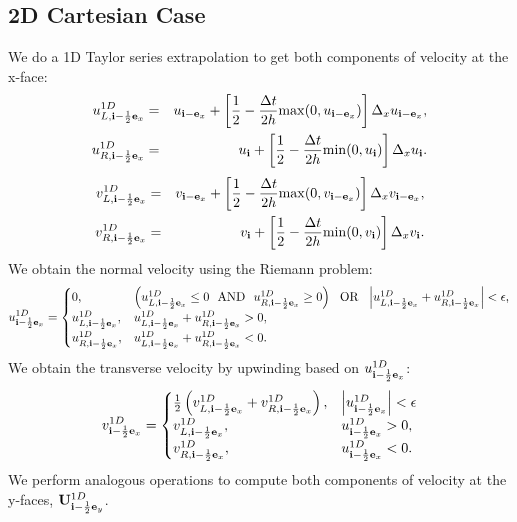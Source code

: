 \documentclass[11pt]{article}
\def\half  {\frac{1}{2}}
\def\dt    {\Delta t}
\def\eb    {{\bf e}}
\def\ib    {{\bf i}}
\def\Ub    {{\bf U}}
\begin{document}
\subsection{2D Cartesian Case}
We do a 1D Taylor series extrapolation to get both components of velocity at the x-face:
\begin{eqnarray}
u_{L,\ib-\half\eb_x}^{1D} &=& u_{\ib-\eb_x} + \left[\half - \frac{\dt}{2h}{\rm max}(0,u_{\ib-\eb_x})\right]\Delta_xu_{\ib-\eb_x}, \label{varden U_L^1D} \\
u_{R,\ib-\half\eb_x}^{1D} &=& u_{\ib} + \left[\half - \frac{\dt}{2h}{\rm min}(0,u_{\ib})\right]\Delta_xu_{\ib}.
\end{eqnarray}
\begin{eqnarray}
v_{L,\ib-\half\eb_x}^{1D} &=& v_{\ib-\eb_x} + \left[\half - \frac{\dt}{2h}{\rm max}(0,v_{\ib-\eb_x})\right]\Delta_xv_{\ib-\eb_x}, \label{varden U_L^1D} \\
v_{R,\ib-\half\eb_x}^{1D} &=& v_{\ib} + \left[\half - \frac{\dt}{2h}{\rm min}(0,v_{\ib})\right]\Delta_xv_{\ib}.
\end{eqnarray}
We obtain the normal velocity using the Riemann problem:
\begin{equation}
u_{\ib-\half\eb_x}^{1D} =
\begin{cases}
0, & \left(u_{L,\ib-\half\eb_x}^{1D} \le 0 ~~ {\rm AND} ~~ u_{R,\ib-\half\eb_x}^{1D} \ge 0\right) ~~ {\rm OR} ~~ \left|u_{L,\ib-\half\eb_x}^{1D} + u_{R,\ib-\half\eb_x}^{1D}\right| < \epsilon, \\
u_{L,\ib-\half\eb_x}^{1D}, & u_{L,\ib-\half\eb_x}^{1D} + u_{R,\ib-\half\eb_x}^{1D} > 0, \\
u_{R,\ib-\half\eb_x}^{1D}, & u_{L,\ib-\half\eb_x}^{1D} + u_{R,\ib-\half\eb_x}^{1D} < 0.
\end{cases}
\end{equation}
We obtain the transverse velocity by upwinding based on $u_{\ib-\half\eb_x}^{1D}$:
\begin{equation}
v_{\ib-\half\eb_x}^{1D} =
\begin{cases}
\half\left(v_{L,\ib-\half\eb_x}^{1D} + v_{R,\ib-\half\eb_x}^{1D}\right), & \left|u_{\ib-\half\eb_x}^{1D}\right| < \epsilon \\
v_{L,\ib-\half\eb_x}^{1D}, & u_{\ib-\half\eb_x}^{1D} > 0, \\
v_{R,\ib-\half\eb_x}^{1D}, & u_{\ib-\half\eb_x}^{1D} < 0.
\end{cases}\label{Transverse Velocity Riemann Problem}
\end{equation}
We perform analogous operations to compute both components of velocity at the y-faces, $\Ub_{\ib-\half\eb_y}^{1D}$. \\
\end{document}
